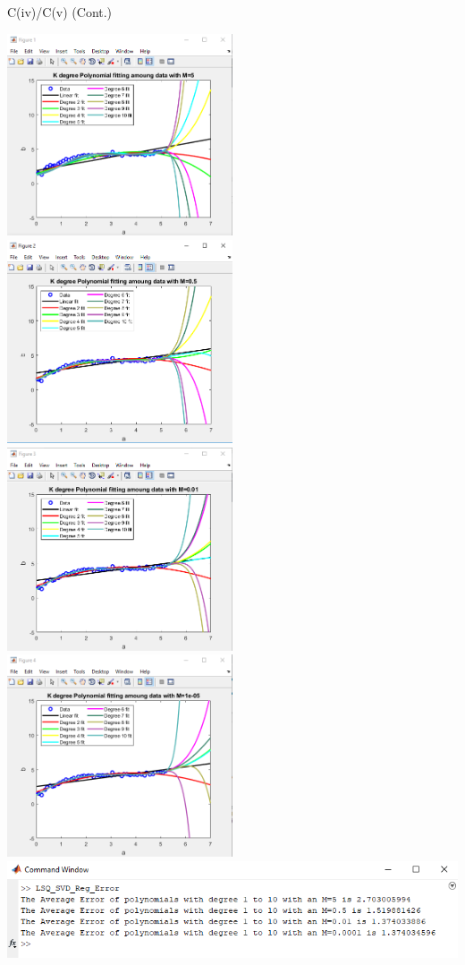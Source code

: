 \documentclass{report}
\begin{document}
\clearpage
\noindent C(iv)/C(v) (Cont.)
\newline
\newline
\begin{tcolorbox}
     \includegraphics[width=0.5\textwidth]{M=5.png}
      \includegraphics[width=0.5\textwidth]{M=05.png}
       \includegraphics[width=0.5\textwidth]{M=001.png}
        \includegraphics[width=0.5\textwidth]{M=00001.png}
         \includegraphics[width=\textwidth]{error_output.png}
\end{tcolorbox}
\end{document}
